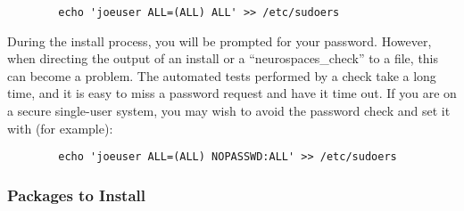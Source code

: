 \documentclass[12pt]{article}
\begin{document}
\begin{verbatim}
        echo 'joeuser ALL=(ALL) ALL' >> /etc/sudoers
\end{verbatim}

During the install process, you will be prompted for your password.
However, when directing the output of an install or a
``neurospaces\_check'' to a file, this can become a problem. The
automated tests performed by a check take a long time, and it is easy
to miss a password request and have it time out.  If you are on a
secure single-user system, you may wish to avoid the password check
and set it with (for example):

\begin{verbatim}
        echo 'joeuser ALL=(ALL) NOPASSWD:ALL' >> /etc/sudoers
\end{verbatim}


\subsubsection*{Packages to Install}
\end{document}
